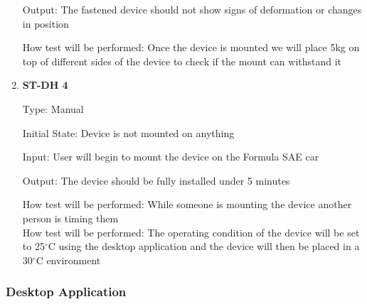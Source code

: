 \documentclass[12pt, titlepage]{article}
\begin{document}
\begin{enumerate}
    Output: The fastened device should not show signs of deformation or changes in position
    
              
    How test will be performed: Once the device is mounted we will place 5kg on top of different sides of the device to check if the mount can withstand it \\

    \item{\bf{ST-DH 4}}
    
    Type: Manual
              
    Initial State: Device is not mounted on anything
              
    Input: User will begin to mount the device on the Formula SAE car
              
    Output: The device should be fully installed under 5 minutes
    
              
    How test will be performed: While someone is mounting the device another person is timing them \\

    
              
              
              
    
              
    How test will be performed: The operating condition of the device will be set to 25$^{\circ}$C using the desktop application and the device will then be placed in a 30$^{\circ}$C environment\\
  
    \end{enumerate}


\subsubsection{Desktop Application}
\end{document}
